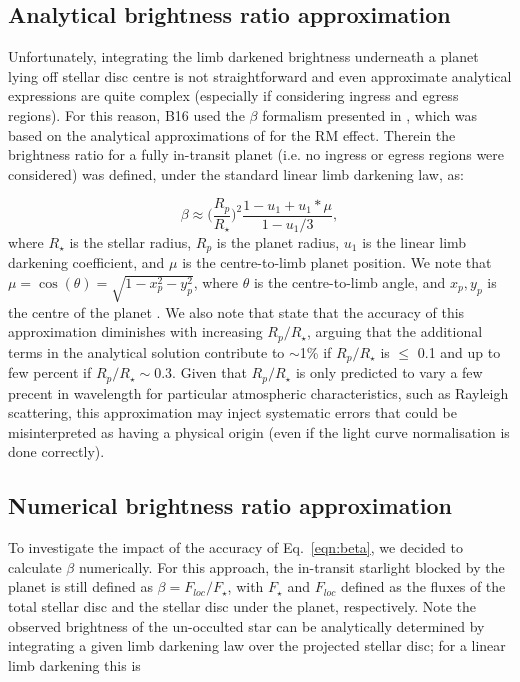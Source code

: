 \documentclass{aa}
\begin{document}
\vspace{-10pt}
\subsection{Analytical brightness ratio approximation}
\label{subsec:analytical}
Unfortunately, integrating the limb darkened brightness underneath a planet lying off stellar disc centre is not straightforward and even approximate analytical expressions are quite complex (especially if considering ingress and egress regions). For this reason, B16 used the $\beta$ formalism presented in \cite{cameron10}, which was based on the analytical approximations of \cite{ohta05} for the RM effect. Therein the brightness ratio for a fully in-transit planet (i.e. no ingress or egress regions were considered) was defined, under the standard linear limb darkening law, as:

\begin{equation}
\label{eqn:beta}
\beta \approx \Bigg( \frac{R_p}{R_\star} \Bigg)^2 \frac{1-u_1 + u_1*\mu}{1-u_1/3},
\end{equation}
where $R_\star$ is the stellar radius, $R_p$ is the planet radius, $u_1$ is the linear limb darkening coefficient, and $\mu$ is the centre-to-limb planet position. We note that $\mu = \cos(\theta) = \sqrt{1-x_p^2-y_p^2}$, where $\theta$ is the centre-to-limb angle, and $x_p, y_p$ is the centre of the planet \citep[see][for details]{cameron10, cegla16b}. We also note that \cite{ohta05} state that the accuracy of this approximation diminishes with increasing $R_p/R_\star$, arguing that the additional terms in the analytical solution contribute to $\sim$1\% if $R_p/R_\star$ is $\le$ 0.1 and up to few percent if $R_p/R_\star \sim 0.3$. Given that $R_p/R_\star$ is only predicted to vary a few precent in wavelength for particular atmospheric characteristics, such as Rayleigh scattering, this approximation may inject systematic errors that could be misinterpreted as having a physical origin (even if the light curve normalisation is done correctly). 

\vspace{-10pt}
\subsection{Numerical brightness ratio approximation}
\label{subsec:numerical}
To investigate the impact of the accuracy of Eq.~\ref{eqn:beta}, we decided to calculate $\beta$ numerically. For this approach, the in-transit starlight blocked by the planet is still defined as $\beta = F_{loc}/F_\star$, with $F_\star$ and $F_{loc}$ defined as the fluxes of the total stellar disc and the stellar disc under the planet, respectively. Note the observed brightness of the un-occulted star can be analytically determined by integrating a given limb darkening law over the projected stellar disc; for a linear limb darkening this is
\end{document}
